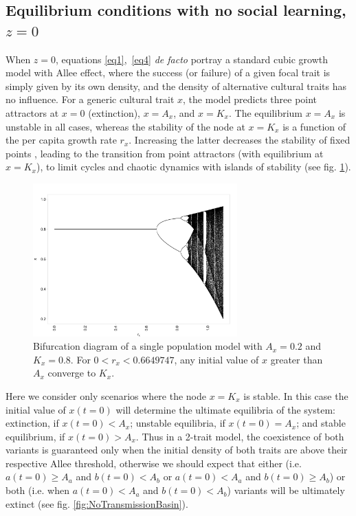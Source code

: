 \documentclass[preprint,authoryear]{elsarticle}
\begin{document}
\subsection{Equilibrium conditions with no social learning, $z=0$}

When $z=0$, equations \ref{eq1},~\ref{eq4} \emph{de facto} portray a standard cubic growth model with Allee effect, where the success (or failure) of a given focal trait is simply given by its own density, and the density of alternative cultural traits has no influence. For a generic cultural trait $x$, the model predicts three point attractors at $x=0$ (extinction), $x=A_x$, and $x=K_x$. The equilibrium $x=A_x$ is unstable in all cases, whereas the stability of the node at $x=K_x$ is a function of the per capita growth rate $r_x$. Increasing the latter decreases the stability of fixed points \citep{scheuring_1999}, leading to the transition from point attractors (with equilibrium at $x=K_x$), to limit cycles and chaotic dynamics with islands of stability (see fig. \ref{fig:bifurcationDiagram}). %

\begin{figure}[h!]
  \centering
      \includegraphics[width=0.7\textwidth]{./figures/figure1.jpg}
  \caption{Bifurcation diagram of a single population model with $A_x=0.2$ and $K_x=0.8$. For $0<r_x<0.6649747$, any initial value of $x$ greater than $A_x$ converge to $K_x$.}
    \label{fig:bifurcationDiagram}
\end{figure}

Here we consider only scenarios where the node $x=K_x$ is stable. In this case the initial value of $x(t=0)$ will determine the ultimate equilibria of the system: extinction, if $x(t=0)<A_x$; unstable equilibria, if $x(t=0)=A_x$; and stable equilibrium, if $x(t=0)>A_x$. Thus in a 2-trait model, the coexistence of both variants is guaranteed only when the initial density of both traits are above their respective Allee threshold, otherwise we should expect that either (i.e. $a(t=0) \geq A_a$ and $b(t=0)<A_b$ or $a(t=0)<A_a$ and $b(t=0) \geq A_b$) or both (i.e. when $a(t=0)<A_a$ and $b(t=0)<A_b$) variants will be ultimately extinct (see fig. \ref{fig:NoTransmissionBasin}). 
\end{document}
